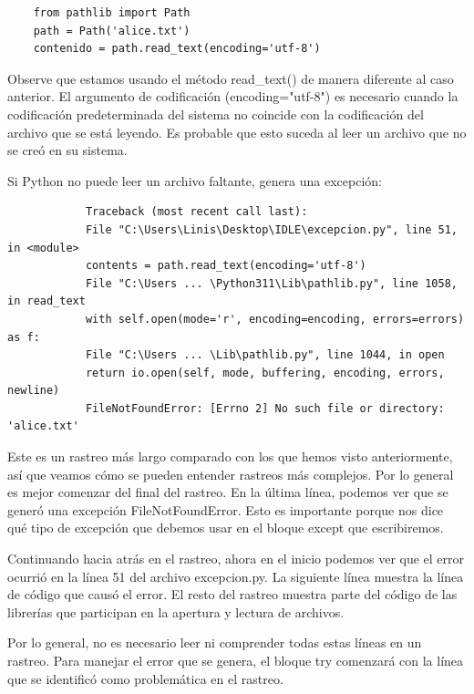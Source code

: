 \hspace{-2.5cm}{\ttfamily \scriptsize alice.py}  \vspace{-0.5cm} 
\begin{lstlisting}
	from pathlib import Path
	path = Path('alice.txt')
	contenido = path.read_text(encoding='utf-8')
\end{lstlisting}

Observe que estamos usando el método  {\ttfamily read\_text()} de manera  diferente al caso anterior. El argumento de codificación ({\ttfamily encoding={}"{}utf-8{}"{}}) es necesario cuando la codificación predeterminada del sistema no coincide con la codificación del archivo que se está leyendo. Es probable que esto suceda al leer un archivo que no se creó en su sistema. 

Si Python no puede leer un archivo faltante, genera una excepción:
{\ttfamily\scriptsize\scriptsize 
	\hspace{-0.65cm} \vspace{-0.3cm}	
	{\color{red}
		\begin{verbatim}		 	
			Traceback (most recent call last):
			File "C:\Users\Linis\Desktop\IDLE\excepcion.py", line 51, in <module>
			contents = path.read_text(encoding='utf-8')
			File "C:\Users ... \Python311\Lib\pathlib.py", line 1058, in read_text
			with self.open(mode='r', encoding=encoding, errors=errors) as f:
			File "C:\Users ... \Lib\pathlib.py", line 1044, in open
			return io.open(self, mode, buffering, encoding, errors, newline)
			FileNotFoundError: [Errno 2] No such file or directory: 'alice.txt'
		\end{verbatim}
}}
Este es un rastreo más largo comparado con los que hemos visto anteriormente, así que veamos cómo se pueden entender rastreos más complejos. Por lo general es mejor comenzar del final del rastreo. En la última línea, podemos ver que se generó una excepción {\ttfamily FileNotFoundError}. Esto es importante porque nos dice qué tipo de excepción que debemos usar en el bloque {\ttfamily except} que escribiremos.

Continuando hacia atrás en el rastreo, ahora en el inicio podemos ver que el error ocurrió en la línea 51 del archivo {\ttfamily excepcion.py}. La siguiente línea muestra la línea de código que causó el error.  
El resto del rastreo muestra parte del código de las librerías que participan en la apertura y lectura de archivos.

Por lo general, no es necesario leer ni comprender todas estas líneas en un rastreo. Para manejar el error que se genera, el bloque {\ttfamily try} comenzará con la línea que se identificó como problemática en el rastreo.

